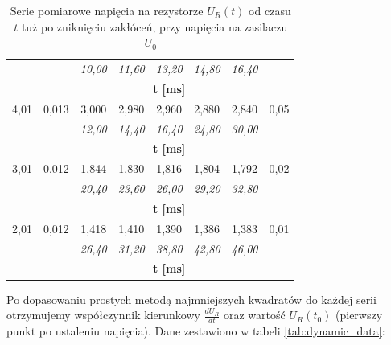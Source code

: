 \documentclass[12pt]{article}
\begin{document}
\begin{table}[H]
\begin{tabular}{c|c|ccccc|c}
                &         & \textit{10{,}00}  & \textit{11{,}60}  & \textit{13{,}20}  & \textit{14{,}80}  & \textit{16{,}40} & \\
                &         & \multicolumn{5}{c}{\textbf{t [ms]}} & \\[6pt]
        \midrule
        4{,}01  & 0{,}013 & 3{,}000  & 2{,}980  & 2{,}960  & 2{,}880  & 2{,}840 & 0{,}05 \\
                &         & \textit{12{,}00}  & \textit{14{,}40}  & \textit{16{,}40}  & \textit{24{,}80}  & \textit{30{,}00} & \\
                &         & \multicolumn{5}{c}{\textbf{t [ms]}} & \\[6pt]
        \midrule
        3{,}01  & 0{,}012 & 1{,}844  & 1{,}830  & 1{,}816  & 1{,}804  & 1{,}792 & 0{,}02 \\
                &         & \textit{20{,}40}  & \textit{23{,}60}  & \textit{26{,}00}  & \textit{29{,}20}  & \textit{32{,}80} & \\
                &         & \multicolumn{5}{c}{\textbf{t [ms]}} & \\[6pt]
        \midrule
        2{,}01  & 0{,}012 & 1{,}418  & 1{,}410  & 1{,}390  & 1{,}386  & 1{,}383 & 0{,}01 \\
                &         & \textit{26{,}40}  & \textit{31{,}20}  & \textit{38{,}80}  & \textit{42{,}80}  & \textit{46{,}00} & \\
                &         & \multicolumn{5}{c}{\textbf{t [ms]}} & \\[6pt]
        \bottomrule
    \end{tabular}
    \caption{Serie pomiarowe napięcia na rezystorze $U_R(t)$ od czasu $t$ tuż po zniknięciu zakłóceń, przy napięcia na zasilaczu $U_0$}
    \label{tab:lines_data}
\end{table}

Po dopasowaniu prostych metodą najmniejszych kwadratów do każdej serii otrzymujemy współczynnik kierunkowy $\frac{dU_R}{dt}$ oraz wartość $U_R(t_0)$ (pierwszy punkt po ustaleniu napięcia). Dane zestawiono w tabeli \ref{tab:dynamic_data}:
\end{document}
